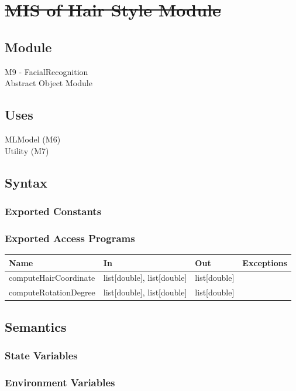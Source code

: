 \documentclass[12pt, titlepage]{article}
\begin{document}
\newpage
\section{\sout{MIS of Hair Style Module}}
\subsection{Module}
M9 - FacialRecognition\\
Abstract Object Module

\subsection{Uses}
MLModel (M6) \\
Utility (M7)

\subsection{Syntax}

\subsubsection{Exported Constants}
\subsubsection{Exported Access Programs}

\begin{center}
\begin{tabular}{p{4cm} p{3cm} p{4cm} p{4cm}}
\hline
\textbf{Name} & \textbf{In} & \textbf{Out} & \textbf{Exceptions} \\
\hline
computeHairCoordinate & list[double], list[double] & list[double] &  \\
computeRotationDegree & list[double], list[double] & list[double] &  \\
\hline
\end{tabular}
\end{center}

\subsection{Semantics}

\subsubsection{State Variables}

\subsubsection{Environment Variables}
\end{document}
